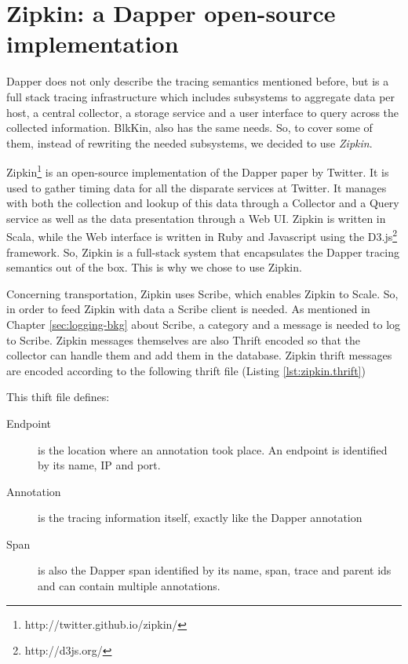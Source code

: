 \section{Zipkin: a Dapper open-source implementation}\label{sec:zipkin}

Dapper does not only describe the tracing semantics mentioned before, but is a
full stack tracing infrastructure which includes subsystems to aggregate data
per host, a central collector, a storage service and a user interface to query
across the collected information. BlkKin, also has the same needs. So, to cover
some of them, instead of rewriting the needed subsystems, we decided to use
\textit{Zipkin}.


Zipkin\footnote{http://twitter.github.io/zipkin/} is an open-source
implementation of the Dapper paper by Twitter. It is used to gather timing data
for all the disparate services at Twitter. It manages with both the collection
and lookup of this data through a Collector and a Query service as well as the
data presentation through a Web UI. Zipkin is written in Scala, while the Web
interface is written in Ruby and Javascript using the
D3.js\footnote{http://d3js.org/} framework. So, Zipkin is a full-stack system
that encapsulates the Dapper tracing semantics out of the box. This is why we
chose to use Zipkin.

Concerning transportation, Zipkin uses Scribe, which enables Zipkin to Scale.
So, in order to feed Zipkin with data a Scribe client is needed. As mentioned
in Chapter \ref{sec:logging-bkg} about Scribe, a category and a message is
needed to log to Scribe. Zipkin messages themselves are also Thrift encoded so
that the collector can handle them and add them in the database. Zipkin thrift
messages are encoded according to the following thrift file (Listing
\ref{lst:zipkin.thrift}) 

This thift file defines:

\begin{description}
\item[Endpoint] is the location where an annotation took place. An endpoint is
identified by its name, IP and port.
\item[Annotation] is the tracing information itself, exactly like the Dapper
annotation
\item[Span] is also the Dapper span identified by its name, span, trace and
parent ids and can contain multiple annotations.
\end{description} 

